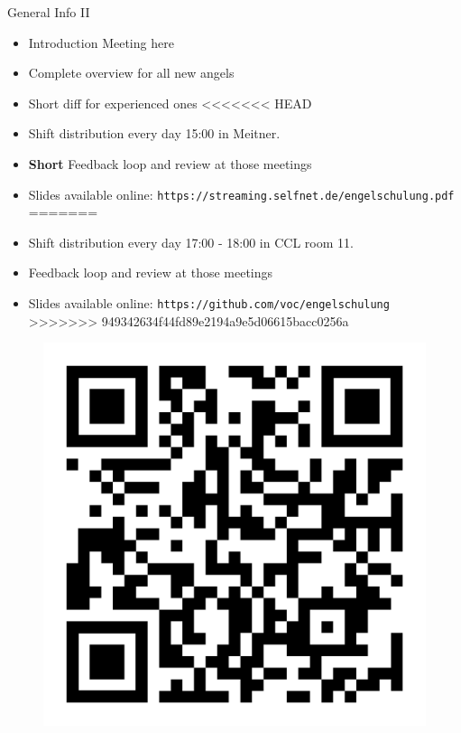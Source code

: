 \documentclass[aspectratio=169]{beamer}
\begin{document}
\begin{frame}{General Info II}
	\begin{itemize}
		\item Introduction Meeting here
		\item Complete overview for all new angels
		\item Short diff for experienced ones
<<<<<<< HEAD
		\item Shift distribution every day 15:00 in Meitner.
		\item \textbf{Short} Feedback loop and review at those meetings
		\item Slides available online: \texttt{https://streaming.selfnet.de/engelschulung.pdf}%
=======
		\item Shift distribution every day 17:00 - 18:00 in CCL room 11.
		\item Feedback loop and review at those meetings
		\item Slides available online: \texttt{https://github.com/voc/engelschulung}
>>>>>>> 949342634f44fd89e2194a9e5d06615bacc0256a
	\end{itemize}
	\begin{figure} 
		\centering
		\includegraphics[height=0.4\textheight]{images/qr-code.png}
	\end{figure}
\end{frame}
\end{document}
